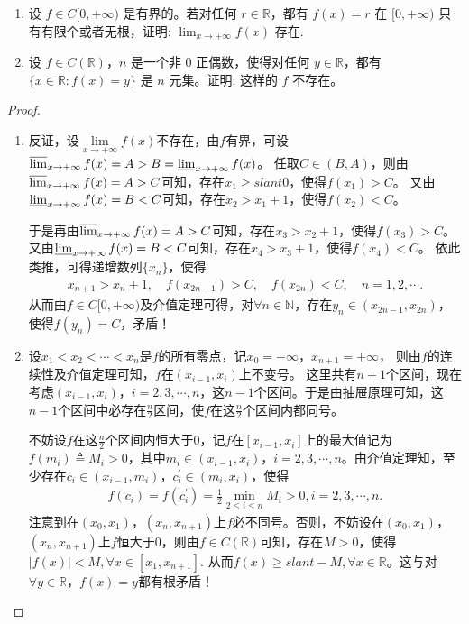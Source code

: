 \documentclass[../../main.tex]{subfiles}
\begin{document}
\begin{example}
\begin{enumerate}
\item 设 \(f\in C[0,+\infty)\) 是有界的。若对任何 \(r\in\mathbb{R}\)，都有 \(f(x)=r\) 在 \([0,+\infty)\) 只有有限个或者无根，证明:
$\lim_{x \to +\infty} f(x) \text{ 存在}.$

\item 设 \(f\in C(\mathbb{R})\)，\(n\) 是一个非 \(0\) 正偶数，使得对任何 \(y\in\mathbb{R}\)，都有 \(\{x\in\mathbb{R}:f(x)=y\}\) 是 \(n\) 元集。证明: 这样的 \(f\) 不存在。 
\end{enumerate}
\end{example}
\begin{proof}
\begin{enumerate}
\item 反证，设\(\lim\limits_{x \to +\infty} f(x)\)不存在，由\(f\)有界，可设\(\varlimsup_{x \to +\infty} f(x)=A > B=\varliminf_{x \to +\infty} f(x)\)。
任取\(C\in (B,A)\)，则由\(\varlimsup_{x \to +\infty} f(x)=A > C\)可知，存在\(x_1\geqslant slant 0\)，使得\(f(x_1)>C\)。
又由\(\varliminf_{x \to +\infty} f(x)=B < C\)可知，存在\(x_2 > x_1 + 1\)，使得\(f(x_2)<C\)。

于是再由\(\varlimsup_{x \to +\infty} f(x)=A > C\)可知，存在\(x_3 > x_2 + 1\)，使得\(f(x_3)>C\)。
又由\(\varliminf_{x \to +\infty} f(x)=B < C\)可知，存在\(x_4 > x_3 + 1\)，使得\(f(x_4)<C\)。
依此类推，可得递增数列\(\{x_n\}\)，使得
\begin{align*}
x_{n + 1} > x_n + 1, \quad f(x_{2n - 1}) > C, \quad f(x_{2n}) < C, \quad n = 1,2,\cdots.
\end{align*}
从而由\(f\in C[0,+\infty)\)及介值定理可得，对\(\forall n\in\mathbb{N}\)，存在\(y_n\in (x_{2n - 1},x_{2n})\)，使得\(f(y_n)=C\)，矛盾！ 

\item 设\(x_1<x_2<\cdots <x_n\)是\(f\)的所有零点，记\(x_0 = -\infty\)，\(x_{n + 1} = +\infty\)，
则由\(f\)的连续性及介值定理可知，\(f\)在\(( x_{i - 1},x_i )\)上不变号。
这里共有\(n + 1\)个区间，现在考虑\(( x_{i - 1},x_i )\)，\(i = 2,3,\cdots,n\)，这\(n - 1\)个区间。于是由抽屉原理可知，这\(n - 1\)个区间中必存在\(\frac{n}{2}\)区间，使\(f\)在这\(\frac{n}{2}\)个区间内都同号。

不妨设\(f\)在这\(\frac{n}{2}\)个区间内恒大于\(0\)，记\(f\)在\([ x_{i - 1},x_i ]\)上的最大值记为\(f( m_i ) \triangleq M_i>0\)，其中\(m_i\in ( x_{i - 1},x_i )\)，\(i = 2,3,\cdots,n\)。由介值定理知，至少存在\(c_i\in ( x_{i - 1},m_i )\)，\(c_{i}^{\prime}\in ( m_i,x_i )\)，使得
\begin{align*}
f( c_i ) =f( c_{i}^{\prime} ) =\frac{1}{2}\underset{2\leqslant  i\leqslant  n}{\min}M_i>0,i = 2,3,\cdots,n.
\end{align*}
注意到在\(( x_0,x_1 )\)，\(( x_n,x_{n + 1} )\)上\(f\)必不同号。否则，不妨设在\(( x_0,x_1 )\)，\(( x_n,x_{n + 1} )\)上\(f\)恒大于\(0\)，则由\(f\in C( \mathbb{R} )\)可知，存在\(M>0\)，使得
\(\left| f( x ) \right|<M,\forall x\in [ x_1,x_{n + 1} ].\)
从而\(f( x ) \geqslant slant -M,\forall x\in \mathbb{R} \)。这与对\(\forall y\in \mathbb{R} \)，\(f( x ) =y\)都有根矛盾！


\end{enumerate}
\end{proof}
\end{document}
